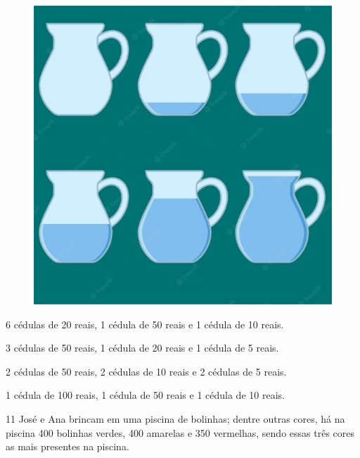 \begin{figure}[htpb!]
\includegraphics[width=\textwidth]{./media/image146.png}
\end{figure}

\begin{escolha}
\item 6 cédulas de 20 reais, 1 cédula de 50 reais e 1 cédula de 10 reais.

\item 3 cédulas de 50 reais, 1 cédula de 20 reais e 1 cédula de 5 reais.

\item 2 cédulas de 50 reais, 2 cédulas de 10 reais e 2 cédulas de 5 reais.

\item 1 cédula de 100 reais, 1 cédula de 50 reais e 1 cédula de 10 reais.
\end{escolha}


\num{11} José e Ana brincam em uma piscina de bolinhas; dentre outras cores, há
na piscina 400 bolinhas verdes, 400 amarelas e 350 vermelhas, sendo
essas três cores as mais presentes na piscina.

